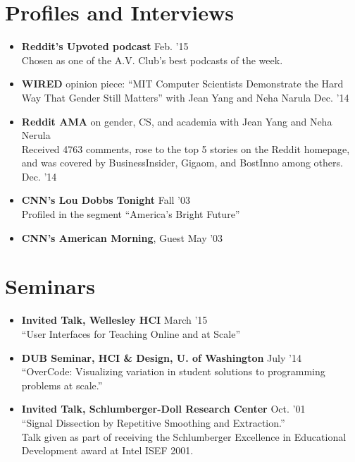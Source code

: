 \documentclass[margin]{res}
\begin{document}
\begin{resume}
\section{Profiles and Interviews}
\begin{itemize}[leftmargin=*] \itemsep -2pt 
\item {\bf Reddit's Upvoted podcast} \hfill Feb. '15 \\ Chosen as one of the A.V. Club's best podcasts of the week.
\item {\bf WIRED} opinion piece: ``MIT Computer Scientists Demonstrate the Hard Way That Gender Still Matters'' with Jean Yang and Neha Narula \hfill Dec. '14
\item {\bf Reddit AMA} on gender, CS, and academia with Jean Yang and Neha Nerula  \\
Received 4763 comments, rose to the top 5 stories on the Reddit homepage, and was covered by BusinessInsider, Gigaom, and BostInno among others. \hfill Dec. '14
\item \textbf{CNN's Lou Dobbs Tonight}  \hfill Fall '03 \\ Profiled in the segment ``America's Bright Future''
\item \textbf{CNN's American Morning}, Guest \hfill May '03
\end{itemize}

\section{Seminars}

\begin{itemize}[leftmargin=*] \itemsep -2pt
\item {\bf Invited Talk, Wellesley HCI}  \hfill March '15 \\``User Interfaces for Teaching Online and at Scale''

\item {\bf DUB Seminar, HCI \& Design, U. of Washington} \hfill July '14 \\``OverCode: Visualizing variation in student solutions to programming problems at scale.''

\item {\bf Invited Talk, Schlumberger-Doll Research Center} \hfill Oct. '01 \\``Signal Dissection by Repetitive Smoothing and Extraction.'' \\
Talk given as part of receiving the Schlumberger Excellence in Educational Development award at Intel ISEF 2001.
\end{itemize}






\end{resume}
\end{document}
